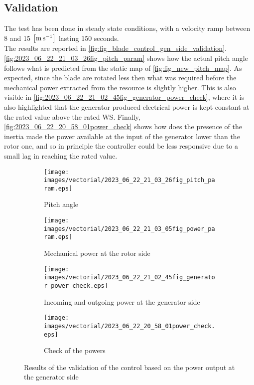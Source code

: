 \subsection{Validation}\label{subsec:validation_control_P_GE}
The test has been done in steady state conditions, with a velocity ramp between 8 and 15 $\left[\si{\meter\per\second}\right]$ lasting 150 seconds.\\
The results are reported in \autoref{fig:fig_blade_control_gen_side_validation}. \autoref{fig:2023_06_22_21_03_26fig_pitch_param} shows how the actual pitch angle follows what is predicted from the static map of \autoref{fig:fig_new_pitch_map}. As expected, since the blade are rotated less then what was required before the mechanical power extracted from the resource is slightly higher. This is also visible in \autoref{fig:2023_06_22_21_02_45fig_generator_power_check}, where it is also highlighted that the generator produced electrical power is kept constant at the rated value above the rated WS. Finally, \autoref{fig:2023_06_22_20_58_01power_check} shows how does the presence of the inertia made the power available at the input of the generator lower than the rotor one, and so in principle the controller could be less responsive due to a small lag in reaching the rated value. 
\begin{figure}[htb]
  \begin{subfigure}{0.5\textwidth}
    \centering
    \texttt{[image: images/vectorial/2023\_06\_22\_21\_03\_26fig\_pitch\_param.eps]}
    \caption{Pitch angle}
    \label{fig:2023_06_22_21_03_26fig_pitch_param}
  \end{subfigure}
  \begin{subfigure}{0.5\textwidth}
    \centering
    \texttt{[image: images/vectorial/2023\_06\_22\_21\_03\_05fig\_power\_param.eps]}
    \caption{Mechanical power at the rotor side}
    \label{fig:2023_06_22_21_03_05fig_power_param}
  \end{subfigure}
  \begin{subfigure}{0.5\textwidth}
    \centering
    \texttt{[image: images/vectorial/2023\_06\_22\_21\_02\_45fig\_generator\_power\_check.eps]}
    \caption{Incoming and outgoing power at the generator side}
    \label{fig:2023_06_22_21_02_45fig_generator_power_check}
  \end{subfigure}
  \begin{subfigure}{0.5\textwidth}
    \centering
    \texttt{[image: images/vectorial/2023\_06\_22\_20\_58\_01power\_check.eps]}
    \caption{Check of the powers}
    \label{fig:2023_06_22_20_58_01power_check}
  \end{subfigure}

  \caption{Results of the validation of the control based on the power output at the generator side}
  \label{fig:fig_blade_control_gen_side_validation}
\end{figure}